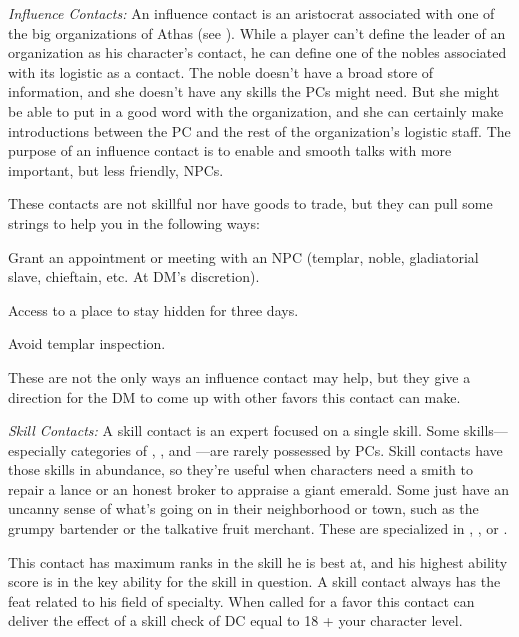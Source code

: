 \textit{Influence Contacts:} An influence contact is an aristocrat associated with one of the big organizations of Athas (see ). While a player can't define the leader of an organization as his character's contact, he can define one of the nobles associated with its logistic as a contact. The noble doesn't have a broad store of information, and she doesn't have any skills the PCs might need. But she might be able to put in a good word with the organization, and she can certainly make introductions between the PC and the rest of the organization's logistic staff. The purpose of an influence contact is to enable and smooth talks with more important, but less friendly, NPCs.

These contacts are not skillful nor have goods to trade, but they can pull some strings to help you in the following ways: 

\begin{itemize*}
\item Grant an appointment or meeting with an NPC (templar, noble, gladiatorial slave, chieftain, etc. At DM's discretion).
\item Access to a place to stay hidden for three days.
\item Avoid templar inspection.
\end{itemize*}

These are not the only ways an influence contact may help, but they give a direction for the DM to come up with other favors this contact can make.

\textit{Skill Contacts:} A skill contact is an expert focused on a single skill. Some skills---especially categories of , , and ---are rarely possessed by PCs. Skill contacts have those skills in abundance, so they're useful when characters need a smith to repair a lance or an honest broker to appraise a giant emerald. Some just have an uncanny sense of what's going on in their neighborhood or town, such as the grumpy bartender or the talkative fruit merchant. These are specialized in , , or .

This contact has maximum ranks in the skill he is best at, and his highest ability score is in the key ability for the skill in question. A skill contact always has the  feat related to his field of specialty. When called for a favor this contact can deliver the effect of a skill check of DC equal to 18 + \onehalf your character level.

